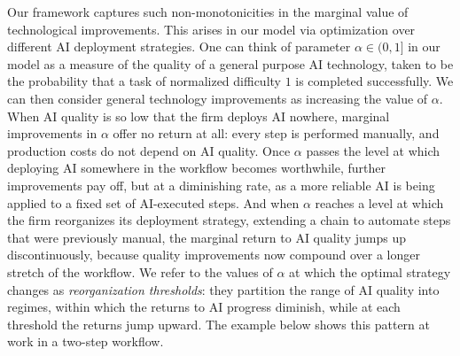 Our framework captures such non-monotonicities in the marginal value of technological improvements.
This arises in our model via optimization over different AI deployment strategies.
One can think of parameter $\alpha \in (0,1]$ in our model as a measure of the quality of a general purpose AI technology, taken to be the probability that a task of normalized difficulty $1$ is completed successfully.
We can then consider general technology improvements as increasing the value of $\alpha$.
When AI quality is so low that the firm deploys AI nowhere, marginal improvements in $\alpha$ offer no return at all: every step is performed manually, and production costs do not depend on AI quality.
Once $\alpha$ passes the level at which deploying AI somewhere in the workflow becomes worthwhile, further improvements pay off, but at a diminishing rate, as a more reliable AI is being applied to a fixed set of AI-executed steps.
And when $\alpha$ reaches a level at which the firm reorganizes its deployment strategy, extending a chain to automate steps that were previously manual, the marginal return to AI quality jumps up discontinuously, because quality improvements now compound over a longer stretch of the workflow.
We refer to the values of $\alpha$ at which the optimal strategy changes as \emph{reorganization thresholds}: they partition the range of AI quality into regimes, within which the returns to AI progress diminish, while at each threshold the returns jump upward.
The example below shows this pattern at work in a two-step workflow.

